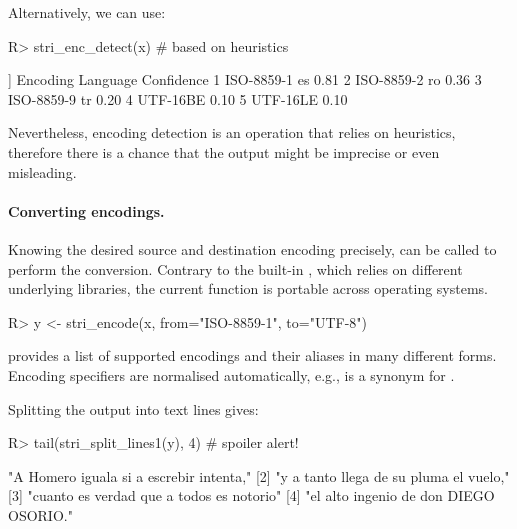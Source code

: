 \documentclass[nojss]{jss}
\begin{document}
\noindent
Alternatively, we can use:

\begin{Schunk}
\begin{Sinput}
R> stri_enc_detect(x)  # based on heuristics
\end{Sinput}
\begin{Soutput}
[[1]]
    Encoding Language Confidence
1 ISO-8859-1       es       0.81
2 ISO-8859-2       ro       0.36
3 ISO-8859-9       tr       0.20
4   UTF-16BE                0.10
5   UTF-16LE                0.10
\end{Soutput}
\end{Schunk}

\noindent
Nevertheless, encoding detection is an operation that relies on heuristics,
therefore there is a  chance that the output might be imprecise or even
misleading.




\paragraph{Converting encodings.}
Knowing the desired source and destination encoding precisely,
 can be called to perform the conversion.
Contrary to the built-in , which relies
on different underlying libraries, the current function is portable
across operating systems.


\begin{Schunk}
\begin{Sinput}
R> y <- stri_encode(x, from="ISO-8859-1", to="UTF-8")
\end{Sinput}
\end{Schunk}

  provides a list of
supported encodings and their aliases in many different forms.
Encoding specifiers are normalised automatically, e.g.,
 is a synonym for .


Splitting the output  into text lines gives:

\begin{Schunk}
\begin{Sinput}
R> tail(stri_split_lines1(y), 4)  # spoiler alert!
\end{Sinput}
\begin{Soutput}
[1] "A Homero iguala si a escrebir intenta,"
[2] "y a tanto llega de su pluma el vuelo,"
[3] "cuanto es verdad que a todos es notorio"
[4] "el alto ingenio de don DIEGO OSORIO."
\end{Soutput}
\end{Schunk}
\end{document}

